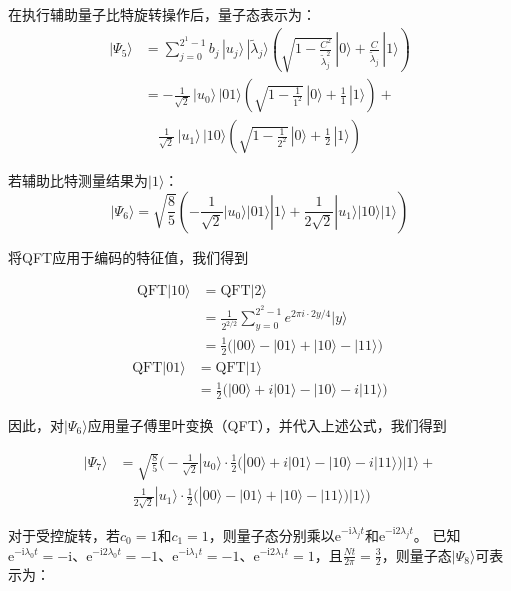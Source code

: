 \documentclass{article}
\begin{document}
在执行辅助量子比特旋转操作后，量子态表示为：
\[
\begin{aligned}
|\Psi_5\rangle &= \sum_{j=0}^{2^1 - 1} b_j \, |u_j\rangle \, |\tilde{\lambda}_j\rangle \left( \sqrt{1 - \frac{C^2}{\tilde{\lambda}_j^2}} \, |0\rangle + \frac{C}{\tilde{\lambda}_j} \, |1\rangle \right) \\
&= -\frac{1}{\sqrt{2}} \, |u_0\rangle \, |01\rangle \left( \sqrt{1 - \frac{1}{1^2}} \, |0\rangle + \frac{1}{1} \, |1\rangle \right) + \\
&\quad \frac{1}{\sqrt{2}} \, |u_1\rangle \, |10\rangle \left( \sqrt{1 - \frac{1}{2^2}} \, |0\rangle + \frac{1}{2} \, |1\rangle \right)
\end{aligned}
\]

若辅助比特测量结果为\(|1\rangle\)：
\[
|\Psi_6\rangle = \sqrt{\frac{8}{5}}\left(-\frac{1}{\sqrt{2}}|u_0\rangle|01\rangle|1\rangle + \frac{1}{2\sqrt{2}}|u_1\rangle|10\rangle|1\rangle\right)
\]

将QFT应用于编码的特征值，我们得到

\[
\begin{aligned}
\text{QFT}|10\rangle &= \text{QFT}|2\rangle \\
&= \frac{1}{2^{2/2}} \sum_{y=0}^{2^2 - 1} e^{2\pi i \cdot 2y / 4} |y\rangle \\
&= \frac{1}{2} \bigl( |00\rangle - |01\rangle + |10\rangle - |11\rangle \bigr)
\end{aligned}
\]
\[
\begin{aligned}
\text{QFT}|01\rangle &= \text{QFT}|1\rangle \\
&= \frac{1}{2} \bigl( |00\rangle + i|01\rangle - |10\rangle - i|11\rangle \bigr)
\end{aligned}
\]

因此，对\(\lvert \Psi_6 \rangle\)应用量子傅里叶变换（QFT），并代入上述公式，我们得到

\[
\begin{aligned}
|\Psi_7\rangle &= \sqrt{\frac{8}{5}} \Biggl( -\frac{1}{\sqrt{2}} |u_0\rangle \cdot \frac{1}{2} \bigl( |00\rangle + i|01\rangle - |10\rangle - i|11\rangle \bigr)|1\rangle + \\
&\quad \frac{1}{2\sqrt{2}} |u_1\rangle \cdot \frac{1}{2} \bigl( |00\rangle - |01\rangle + |10\rangle - |11\rangle \bigr)|1\rangle \Biggr)
\end{aligned}
\]

对于受控旋转，若$c_0 = 1$和$c_1 = 1$，则量子态分别乘以$\text{e}^{-\text{i}\lambda_j t}$和$\text{e}^{-\text{i}2\lambda_j t}$。  
已知$\text{e}^{-\text{i}\lambda_0 t} = -\text{i}$、$\text{e}^{-\text{i}2\lambda_0 t} = -1$、$\text{e}^{-\text{i}\lambda_1 t} = -1$、$\text{e}^{-\text{i}2\lambda_1 t} = 1$，且$\frac{N t}{2\pi} = \frac{3}{2}$，则量子态$|\Psi_8\rangle$可表示为：  
\end{document}
